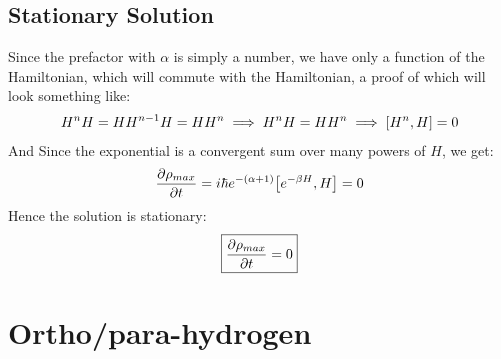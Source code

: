 \documentclass[12pt]{article}
\begin{document}
\subsection{Stationary Solution}
Since the prefactor with $\alpha$ is simply a number, we have only a function of the Hamiltonian, which will commute with the Hamiltonian, a proof of which will look something like:
\begin{align*}
  H^nH=H H^{n-1}H=H H^n\implies H^n H=HH^n\implies \comm{H^n}{H}=0
\end{align*}
And Since the exponential is a convergent sum over many powers of $H$, we get:
\begin{align*}
  \pdv{\rho_{max}}{t}=i\hbar e^{-(\alpha+1)}\comm{e^{-\beta H}}{H}=0
\end{align*}
Hence the solution is stationary:
\begin{align}
  \boxed{\pdv{\rho_{max}}{t}=0}
\end{align}

\section{Ortho/para-hydrogen}
\end{document}
